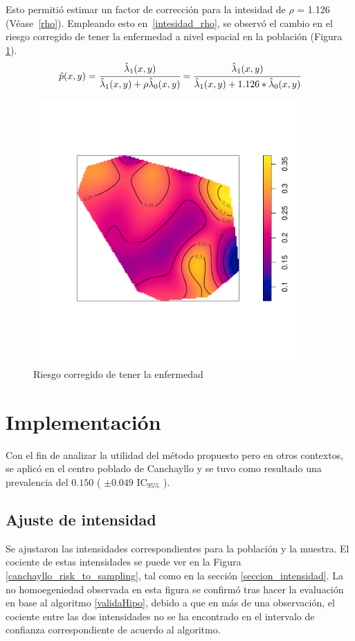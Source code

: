 \newpage
Esto permitió estimar un factor de corrección para la intesidad de $\rho$ = 1.126 (Véase~\ref{rho}). Empleando esto en~\ref{intesidad_rho}, se observó el cambio en el riesgo corregido de tener la enfermedad a nivel espacial en la población (Figura \ref{risk_to_disease_fixed}).
\begin{equation*}
	\hat{p}(x,y) = \cfrac{\hat{\lambda}_1(x,y)}{\hat{\lambda}_1(x,y)+ \rho \hat{\lambda}_0(x,y)} = \cfrac{\hat{\lambda}_1(x,y)}{\hat{\lambda}_1(x,y)+ 1.126* \hat{\lambda}_0(x,y)}
\end{equation*}

\begin{figure}[h]
	\centering
	\includegraphics[width=0.9\textwidth]{graficos/risk_to_disease_fixed.pdf}
	\caption{Riesgo corregido de tener la enfermedad} \label{risk_to_disease_fixed}
\end{figure}




\newpage


\section{Implementación}
Con el fin de analizar la utilidad del método propuesto pero en otros contextos, se aplicó en el centro poblado de Canchayllo y se tuvo como resultado una prevalencia del $0.150$ ( $\pm 0.049$ IC$_{95\%}$  ).

\subsection*{Ajuste de intensidad}
Se ajustaron las intensidades correspondientes para la población y la muestra. El cociente de estas intensidades se puede ver en la Figura \ref{canchayllo_risk_to_sampling}, tal como en la sección \ref{seccion_intensidad}. La no homoegeniedad observada en esta figura se confirmó tras hacer la evaluación en base al algoritmo \ref{validaHipo}, debido a que en más de una observación, el cociente entre las dos intensidades no se ha encontrado en el intervalo de confianza correspondiente de acuerdo al algoritmo.


